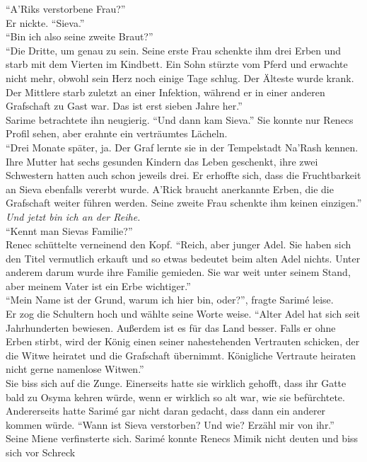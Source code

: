 ``A'Riks verstorbene Frau?''\\
Er nickte. ``Sieva.''\\
``Bin ich also seine zweite Braut?''\\
``Die Dritte, um genau zu sein. Seine erste Frau schenkte ihm drei Erben und starb mit dem Vierten 
im Kindbett. Ein Sohn stürzte vom Pferd und erwachte nicht mehr, obwohl sein Herz noch einige Tage 
schlug. Der Älteste wurde krank. Der Mittlere starb zuletzt an einer Infektion, während er in einer 
anderen Grafschaft zu Gast war. Das ist erst sieben Jahre her.''\\
Sarime betrachtete ihn neugierig. ``Und dann kam Sieva.'' Sie konnte nur Renecs Profil sehen, aber 
erahnte ein verträumtes Lächeln.\\
``Drei Monate später, ja. Der Graf lernte sie in der Tempelstadt Na'Rash kennen. Ihre Mutter hat 
sechs gesunden Kindern das Leben geschenkt, ihre zwei Schwestern hatten auch schon jeweils drei. Er 
erhoffte sich, dass die Fruchtbarkeit an Sieva ebenfalls vererbt wurde. A'Rick braucht anerkannte 
Erben, die die Grafschaft weiter führen werden. Seine zweite Frau schenkte ihm keinen einzigen.''\\
\textit{Und jetzt bin ich an der Reihe.}\\
``Kennt man Sievas Familie?''\\
Renec schüttelte verneinend den Kopf. ``Reich, aber junger Adel. Sie haben sich den Titel 
vermutlich erkauft und so etwas bedeutet beim alten Adel nichts. Unter anderem darum wurde ihre 
Familie gemieden. Sie war weit unter seinem Stand, aber meinem Vater ist ein Erbe wichtiger.''\\
``Mein Name ist der Grund, warum ich hier bin, oder?'', fragte Sarimé leise.\\
Er zog die Schultern hoch und wählte seine Worte weise. ``Alter Adel hat sich seit Jahrhunderten 
bewiesen. Außerdem ist es für das Land besser. Falls er ohne Erben stirbt, wird der König einen 
seiner nahestehenden Vertrauten schicken, der die Witwe heiratet und die Grafschaft übernimmt. 
Königliche Vertraute heiraten nicht gerne namenlose Witwen.''\\
Sie biss sich auf die Zunge. Einerseits hatte sie wirklich gehofft, dass ihr Gatte bald zu Osyma 
kehren würde, wenn er wirklich so alt war, wie sie befürchtete. Andererseits hatte Sarimé gar nicht 
daran gedacht, dass dann ein anderer kommen würde. ``Wann ist Sieva verstorben? Und wie? Erzähl mir 
von ihr.''\\
Seine Miene verfinsterte sich. Sarimé konnte Renecs Mimik nicht deuten und biss sich vor Schreck 
